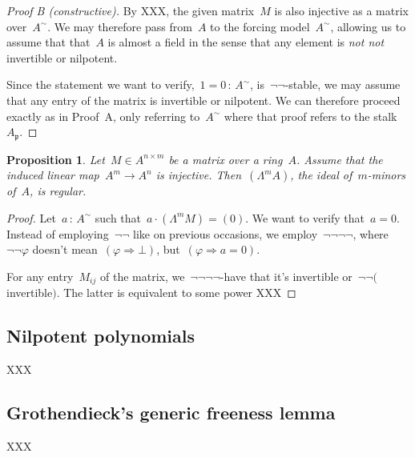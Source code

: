\documentclass{amsart}
\theoremstyle{definition}
\theoremstyle{plain}
\newtheorem{prop}[defn]{Proposition}
\theoremstyle{remark}
\newcommand{\ppp}{\mathfrak{p}}
\newcommand{\?}{\,{:}\,}
\newcommand{\notnot}{\emph{not not}\xspace}
\newcommand{\negg}{\neg\!\!\!\neg}
\begin{document}
\begin{proof}[Proof B (constructive)]By XXX, the given matrix~$M$ is also
injective as a matrix over~$A^\sim$. We may therefore pass from~$A$ to the
forcing model~$A^\sim$, allowing us to assume that that~$A$ is almost a field
in the sense that any element is \notnot invertible or nilpotent.

Since the statement we want to verify,~$1 = 0 \? A^\sim$, is~$\neg\neg$-stable,
we may assume that any entry of the matrix is invertible or nilpotent. We can
therefore proceed exactly as in Proof~A, only referring to~$A^\sim$ where that
proof refers to the stalk~$A_\ppp$.
\end{proof}

\begin{prop}Let~$M \in A^{n \times m}$ be a matrix over a ring~$A$. Assume that
the induced linear map~$A^m \to A^n$ is injective. Then~$(\Lambda^m A)$, the
ideal of~$m$-minors of~$A$, is regular.
\end{prop}

\begin{proof}Let~$a \? A^\sim$ such that~$a \cdot (\Lambda^m M) = (0)$. We want
to verify that~$a = 0$. Instead of employing~$\neg\neg$ like on previous
occasions, we employ~$\negg\negg$, where~$\negg\varphi$ doesn't mean~$(\varphi
\Rightarrow \bot)$, but~$(\varphi \Rightarrow a = 0)$.

For any entry~$M_{ij}$ of the matrix, we~$\negg\negg$-have that it's invertible
or~$\negg($invertible$)$. The latter is equivalent to some power XXX
\end{proof}


\subsection{Nilpotent polynomials}

XXX

\subsection{Grothendieck's generic freeness lemma}

XXX
\end{document}
